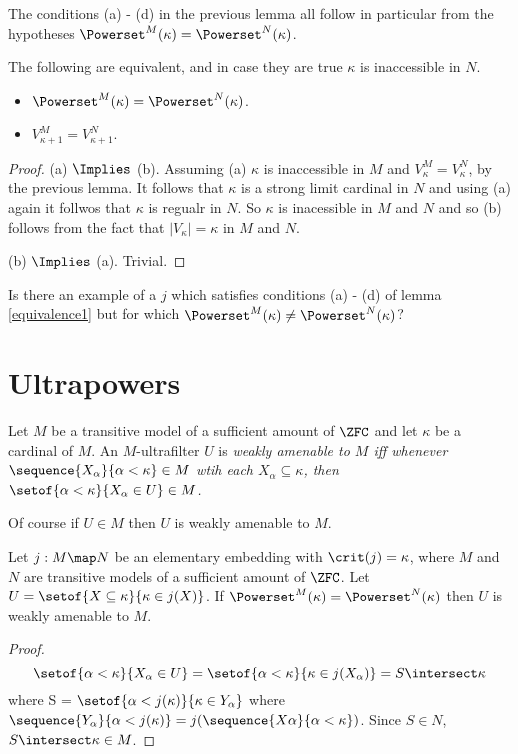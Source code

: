 \documentclass[oneside,12pt]{amsart}
\begin{document}
The conditions (a) - (d) in the previous lemma all follow in particular from the
hypotheses $\Powerset^{M}(\kappa) = \Powerset^{N}(\kappa)$.

\begin{lemma}
\label{equivalence2}
The following are equivalent, and in case they are true
$\kappa$ is inaccessible in $N$.
\begin{itemize}
\item[(a)]  $\Powerset^{M}(\kappa) = \Powerset^{N}(\kappa)$.

\item[(b)] $V^{M}_{\kappa + 1} = V^{N}_{\kappa + 1}$.
\end{itemize}
\end{lemma}
\begin{proof}
(a) $\Implies$ (b). Assuming (a) $\kappa$ is inaccessible in $M$
and $V^{M}_{\kappa} = V^{N}_{\kappa}$, by the previous lemma. It follows
that $\kappa$ is a strong limit cardinal in $N$ and using (a) again it follwos
that $\kappa$ is regualr in $N$. So $\kappa$ is inacessible in $M$ and $N$ and
so (b) follows from the fact that $|V_{\kappa}| = \kappa$ in $M$ and $N$.

(b) $\Implies$ (a). Trivial.
\end{proof}

\begin{question}
Is there an example of a $j$ which satisfies conditions (a) - (d) of
lemma \ref{equivalence1} but for which $\Powerset^{M}(\kappa) \not= \Powerset^{N}(\kappa)$?
\end{question}

\section{Ultrapowers}

\begin{definition}
Let $M$ be a transitive model of a sufficient amount of $\ZFC$ and let $\kappa$ be
a cardinal of $M$. An $M$-ultrafilter $U$ is \em{weakly amenable} to $M$ iff whenever
$\sequence{X_{\alpha}}{\alpha<\kappa} \in M$ wtih each $X_{\alpha} \subseteq \kappa$,
then $\setof{\alpha < \kappa}{X_{\alpha} \in U} \in M$.
\end{definition}

Of course if $U\in M$ then $U$ is weakly amenable to $M$.

\begin{lemma}
Let $j:M \map N$ be an elementary embedding with $\crit(j)=\kappa$, where $M$ and $N$ are transitive models of a sufficient amount of $\ZFC$.
Let $U = \setof{X \subseteq \kappa}{\kappa \in j(X)}$. If
$\Powerset^{M}(\kappa) = \Powerset^{N}(\kappa)$ then $U$ is weakly amenable to $M$.
\end{lemma}
\begin{proof}
$$\setof{\alpha < \kappa}{X_{\alpha} \in U} =
\setof{\alpha < \kappa}{\kappa\in j(X_{\alpha})} =
S \intersect \kappa $$
where S = $\setof{\alpha < j(\kappa)}{\kappa\in Y_{\alpha}}$
where $\sequence{Y_{\alpha}}{\alpha<j(\kappa)} = j(\sequence{X{\alpha}}{\alpha<\kappa})$.
Since $S\in N$, $S \intersect \kappa \in M$.
\end{proof}
\end{document}
